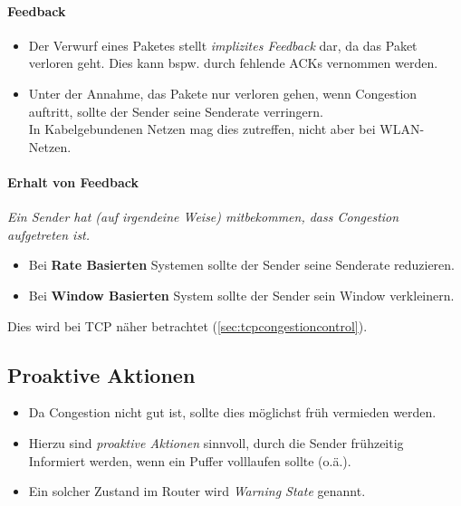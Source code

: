             \paragraph{Feedback}
	            \begin{itemize}
	            	\item Der Verwurf eines Paketes stellt \textit{implizites Feedback} dar, da das Paket verloren geht. Dies kann bspw. durch fehlende ACKs vernommen werden.
		            \item Unter der Annahme, das Pakete nur verloren gehen, wenn Congestion auftritt, sollte der Sender seine Senderate verringern. \\ In Kabelgebundenen Netzen mag dies zutreffen, nicht aber bei WLAN-Netzen.
	            \end{itemize}
	            
            
            \paragraph{Erhalt von Feedback}
	            \textit{Ein Sender hat (auf irgendeine Weise) mitbekommen, dass Congestion aufgetreten ist.}
            
	            \begin{itemize}
	            	\item Bei \textbf{Rate Basierten} Systemen sollte der Sender seine Senderate reduzieren.
	            	\item Bei \textbf{Window Basierten} System sollte der Sender sein Window verkleinern.
	            \end{itemize}
	            
	            Dies wird bei TCP näher betrachtet (\ref{sec:tcpcongestioncontrol}).

        \subsection{Proaktive Aktionen}
            \begin{itemize}
            	\item Da Congestion nicht gut ist, sollte dies möglichst früh vermieden werden.
            	\item Hierzu sind \textit{proaktive Aktionen} sinnvoll, durch die Sender frühzeitig Informiert werden, wenn ein Puffer volllaufen sollte (o.ä.).
            	\item Ein solcher Zustand im Router wird \textit{Warning State} genannt.
            \end{itemize}

